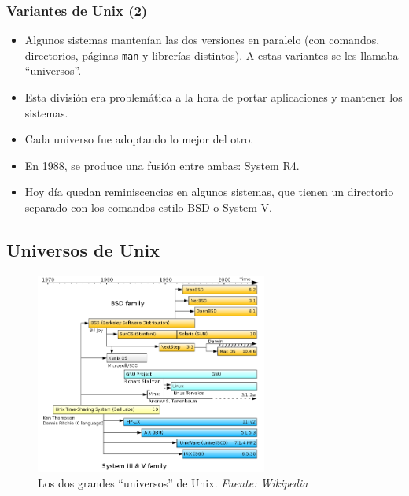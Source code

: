 \documentclass{beamer}
\begin{document}

\begin{frame}
\frametitle{Variantes de Unix (2)}

\begin{itemize}
\item Algunos sistemas mantenían las dos versiones en paralelo (con comandos, directorios, páginas \texttt{man} y librerías distintos). A estas variantes se les llamaba \alert{``universos''}.
\item Esta división era problemática a la hora de portar aplicaciones y mantener los sistemas.
\item Cada universo fue adoptando lo mejor del otro. 
\item En 1988, se produce una fusión entre ambas: \alert{System R4}. 
\item Hoy día quedan reminiscencias en algunos sistemas, que tienen un directorio separado con los comandos estilo BSD o System V.
\end{itemize}


\end{frame}


\subsection{Universos de Unix}
\begin{frame}


\begin{figure}[h]

\begin{center}
  \includegraphics[height=2.60in]{figs/Unix_history.png}
  \caption{{\footnotesize Los dos grandes ``universos'' de Unix. \textit{Fuente: Wikipedia}}}
\end{center}
\end{figure}


\end{frame}
\end{document}
